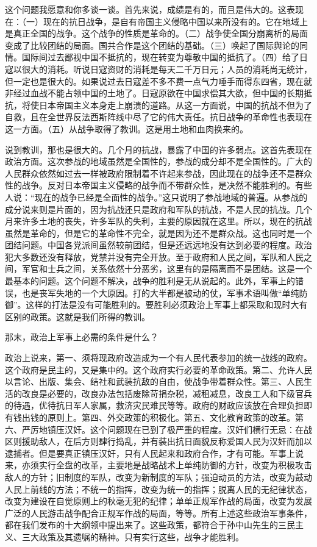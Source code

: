 这个问题我愿意和你多谈一谈。首先来说，成绩是有的，而且是伟大的。这表现在：（一）现在的抗日战争，是自有帝国主义侵略中国以来所没有的。它在地域上是真正全国的战争。这个战争的性质是革命的。（二）战争使全国分崩离析的局面变成了比较团结的局面。国共合作是这个团结的基础。（三）唤起了国际舆论的同情。国际间过去鄙视中国不抵抗的，现在转变为尊敬中国的抵抗了。（四）给了日寇以很大的消耗。听说日寇资财的消耗是每天二千万日元；人员的消耗尚无统计，但一定也是很大的。如果说过去日寇差不多不费一点气力唾手而得东四省，现在就非经过血战不能占领中国的土地了。日寇原欲在中国求偿其大欲，但中国的长期抵抗，将使日本帝国主义本身走上崩溃的道路。从这一方面说，中国的抗战不但为了自救，且在全世界反法西斯阵线中尽了它的伟大责任。抗日战争的革命性也表现在这一方面。（五）从战争取得了教训。这是用土地和血肉换来的。

说到教训，那也是很大的。几个月的抗战，暴露了中国的许多弱点。这首先表现在政治方面。这次参战的地域虽然是全国性的，参战的成分却不是全国性的。广大的人民群众依然如过去一样被政府限制着不许起来参战，因此现在的战争还不是群众性的战争。反对日本帝国主义侵略的战争而不带群众性，是决然不能胜利的。有些人说：“现在的战争已经是全面性的战争。”这只说明了参战地域的普遍。从参战的成分说来则是片面的，因为抗战还只是政府和军队的抗战，不是人民的抗战。几个月来许多土地的丧失，许多军队的失利，主要的原因就在这里。所以，现在的抗战虽然是革命的，但是它的革命性不完全，就是因为还不是群众战。这也同时是一个团结问题。中国各党派间虽然较前团结，但是还远远地没有达到必要的程度。政治犯大多数还没有释放，党禁并没有完全开放。至于政府和人民之间，军队和人民之间，军官和士兵之间，关系依然十分恶劣，这里有的是隔离而不是团结。这是一个最基本的问题。这个问题不解决，战争的胜利是无从说起的。此外，军事上的错误，也是丧军失地的一个大原因。打的大半都是被动的仗，军事术语叫做“单纯防御”。这样的打法是没有可能胜利的。要胜利必须政治上军事上都采取和现时大有区别的政策。这就是我们所得的教训。

那末，政治上军事上必需的条件是什么？

政治上说来，第一、须将现政府改造成为一个有人民代表参加的统一战线的政府。这个政府是民主的，又是集中的。这个政府实行必要的革命政策。第二、允许人民以言论、出版、集会、结社和武装抗敌的自由，使战争带着群众性。第三、人民生活的改良是必要的，改良办法包括废除苛捐杂税，减租减息，改良工人和下级官兵的待遇，优待抗日军人家属，救济灾民难民等等。政府的财政应该放在合理负担即有钱出钱的原则上。第四、外交政策的积极化。第五、文化教育政策的改革。第六、严厉地镇压汉奸。这个问题现在已到了极严重的程度。汉奸们横行无忌：在战区则援助敌人，在后方则肆行捣乱，并有装出抗日面貌反称爱国人民为汉奸而加以逮捕者。但是要真正镇压汉奸，只有人民起来和政府合作，才有可能。军事上说来，亦须实行全盘的改革，主要地是战略战术上单纯防御的方针，改变为积极攻击敌人的方针；旧制度的军队，改变为新制度的军队；强迫动员的方法，改变为鼓动人民上前线的方法；不统一的指挥，改变为统一的指挥；脱离人民的无纪律状态，改变为建设在自觉原则上的秋毫无犯的纪律；单单正规军作战的局面，改变为发展广泛的人民游击战争配合正规军作战的局面，等等。所有上述这些政治军事条件，都在我们发布的十大纲领中提出来了。这些政策，都符合于孙中山先生的三民主义、三大政策及其遗嘱的精神。只有实行这些，战争才能胜利。


